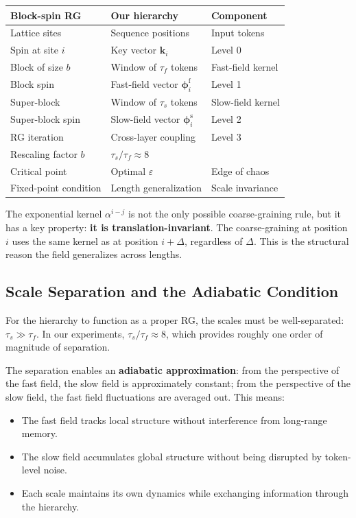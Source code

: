\documentclass[11pt,a4paper]{article}
\newcommand{\vfield}{\boldsymbol{\phi}}
\newcommand{\evap}{\varepsilon}
\newcommand{\retain}{\alpha}
\newcommand{\K}{\mathbf{k}}
\begin{document}
\begin{center}
\begin{tabular}{@{}lll@{}}
\toprule
\textbf{Block-spin RG} & \textbf{Our hierarchy} & \textbf{Component} \\
\midrule
Lattice sites & Sequence positions & Input tokens \\
Spin at site $i$ & Key vector $\K_i$ & Level 0 \\
Block of size $b$ & Window of $\tau_f$ tokens & Fast-field kernel \\
Block spin & Fast-field vector $\vfield^{\mathrm{f}}_i$ & Level 1 \\
Super-block & Window of $\tau_s$ tokens & Slow-field kernel \\
Super-block spin & Slow-field vector $\vfield^{\mathrm{s}}_i$ & Level 2 \\
RG iteration & Cross-layer coupling & Level 3 \\
\midrule
Rescaling factor $b$ & $\tau_s / \tau_f \approx 8$ & \\
Critical point & Optimal $\evap$ & Edge of chaos \\
Fixed-point condition & Length generalization & Scale invariance \\
\bottomrule
\end{tabular}
\end{center}

The exponential kernel $\retain^{i-j}$ is not the only possible
coarse-graining rule, but it has a key property: \textbf{it is
translation-invariant}.  The coarse-graining at position $i$ uses the
same kernel as at position $i + \Delta$, regardless of $\Delta$.
This is the structural reason the field generalizes across lengths.

\subsection{Scale Separation and the Adiabatic Condition}

For the hierarchy to function as a proper RG, the scales must be
well-separated: $\tau_s \gg \tau_f$.  In our experiments,
$\tau_s/\tau_f \approx 8$, which provides roughly one order of
magnitude of separation.

The separation enables an \textbf{adiabatic approximation}: from the
perspective of the fast field, the slow field is approximately
constant; from the perspective of the slow field, the fast field
fluctuations are averaged out.  This means:
\begin{itemize}
  \item The fast field tracks local structure without interference
    from long-range memory.
  \item The slow field accumulates global structure without being
    disrupted by token-level noise.
  \item Each scale maintains its own dynamics while exchanging
    information through the hierarchy.
\end{itemize}
\end{document}
